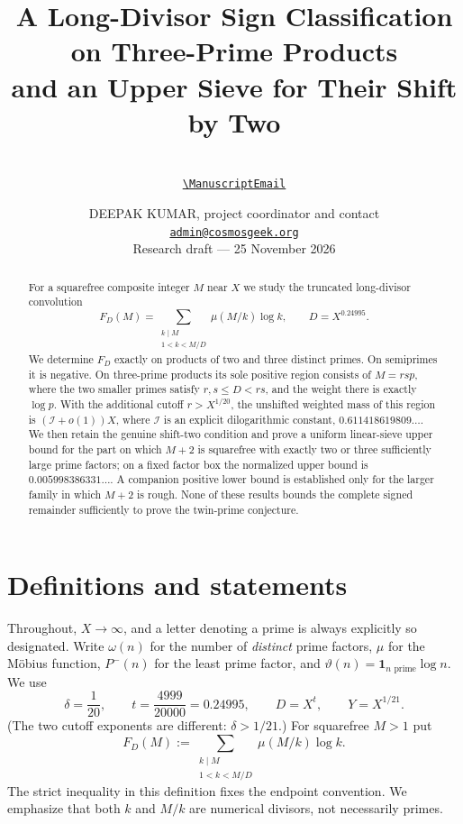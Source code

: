 \documentclass[11pt]{article}
\title{A Long-Divisor Sign Classification on Three-Prime Products\\
\large and an Upper Sieve for Their Shift by Two}
\author{\ManuscriptAuthor\ifx\ManuscriptEmail\empty\else
  \ifx\ManuscriptAuthor\empty\else\\\fi
  {\small\href{mailto:\ManuscriptEmail}{\expandafter\nolinkurl\expandafter{\ManuscriptEmail}}}\fi}
\date{\small DEEPAK KUMAR, project coordinator and contact\\[2pt]
  \href{mailto:admin@cosmosgeek.org}{\nolinkurl{admin@cosmosgeek.org}}\\[4pt]
  Research draft --- 25 November 2026}
\newcommand{\one}{\mathbf 1}
\newcommand{\phimin}{P^-}
\newcommand{\thetap}{\vartheta}
\begin{document}
\maketitle
\begin{abstract}
For a squarefree composite integer $M$ near $X$ we study the truncated
long-divisor convolution
\[
 F_D(M)=\sum_{\substack{k\mid M\\1<k<M/D}}\mu(M/k)\log k,
 \qquad D=X^{0.24995}.
\]
We determine $F_D$ exactly on products of two and three distinct primes.
On semiprimes it is negative.  On three-prime products its sole positive
region consists of $M=rsp$, where the two smaller primes satisfy
$r,s\le D<rs$, and the weight there is exactly $\log p$.
With the additional cutoff \(r>X^{1/20}\), the unshifted weighted mass of this region is
$(\mathcal I+o(1))X$, where $\mathcal I$ is an explicit dilogarithmic
constant, $0.611418619809\ldots$.
We then retain the genuine shift-two condition and prove a uniform
linear-sieve upper bound for the part on which $M+2$ is squarefree with
exactly two or three sufficiently large prime factors; on a fixed factor
box the normalized upper bound is $0.005998386331\ldots$.
A companion positive lower bound is established only for the larger
family in which $M+2$ is rough.  None of these results bounds the
complete signed remainder sufficiently to prove the twin-prime conjecture.
\end{abstract}

\section{Definitions and statements}

Throughout, $X\to\infty$, and a letter denoting a prime is always
explicitly so designated.  Write $\omega(n)$ for the number of
\emph{distinct} prime factors, $\mu$ for the M\"obius function,
$\phimin(n)$ for the least prime factor, and
$\thetap(n)=\one_{n\text{ prime}}\log n$.
We use
\[
 \delta=\frac1{20},\qquad t=\frac{4999}{20000}=0.24995,
 \qquad D=X^t,\qquad Y=X^{1/21}.
\]
(The two cutoff exponents are different: $\delta>1/21$.)
For squarefree $M>1$ put
\begin{equation}\label{eq:F}
 F_D(M):=\sum_{\substack{k\mid M\\1<k<M/D}}
                 \mu(M/k)\log k.
\end{equation}
The strict inequality in this definition fixes the endpoint convention.
We emphasize that both $k$ and $M/k$ are numerical divisors, not
necessarily primes.
\end{document}
